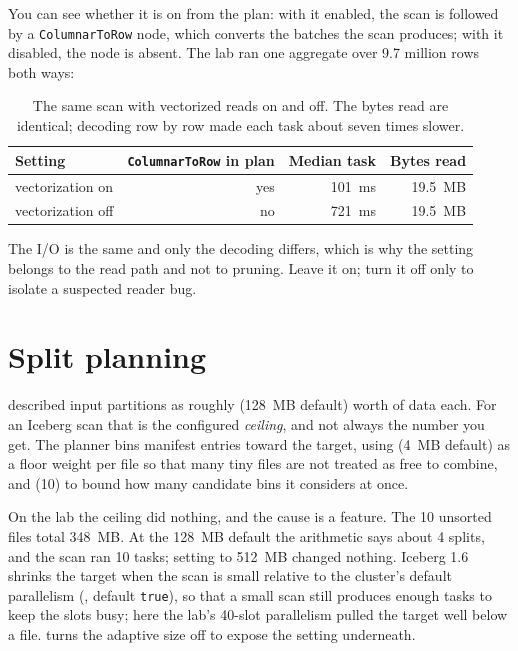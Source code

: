 You can see whether it is on from the plan: with it enabled, the scan is followed
by a \texttt{ColumnarToRow} node, which converts the batches the scan produces;
with it disabled, the node is absent. The lab ran one aggregate over 9.7 million
rows both ways:

\begin{table}[htbp]
\centering\footnotesize
\renewcommand{\arraystretch}{1.25}
\begin{tabular}{@{}lrrr@{}}
\toprule
\textbf{Setting} & \textbf{\texttt{ColumnarToRow} in plan} & \textbf{Median task} & \textbf{Bytes read} \\
\midrule
vectorization on & yes & 101~ms & 19.5~MB \\
vectorization off & no & 721~ms & 19.5~MB \\
\bottomrule
\end{tabular}
\caption{The same scan with vectorized reads on and off. The bytes read are
identical; decoding row by row made each task about seven times slower.}
\label{tab:ice-lab-vectorization}
\end{table}

The I/O is the same and only the decoding differs, which is why the setting
belongs to the read path and not to pruning. Leave it on; turn it off only to
isolate a suspected reader bug.

\section{Split planning}
\label{sec:ice-read-splits}

 described input partitions as roughly
 (128~MB default) worth of data each. For an
Iceberg scan that is the configured \emph{ceiling}, and not always the number you
get. The planner bins manifest entries toward the target, using
 (4~MB default) as a floor weight per file so
that many tiny files are not treated as free to combine, and
 (10) to bound how many candidate bins it
considers at once.

On the lab the ceiling did nothing, and the cause is a feature. The 10 unsorted
files total 348~MB. At the 128~MB default the arithmetic says about 4 splits,
and the scan ran 10 tasks; setting  to 512~MB
changed nothing. Iceberg 1.6 shrinks the target when the scan is small relative
to the cluster's default parallelism (,
default \texttt{true}), so that a small scan still produces enough tasks to keep
the slots busy; here the lab's 40-slot parallelism pulled the target well below
a file.  turns the adaptive size off to expose the
setting underneath.

